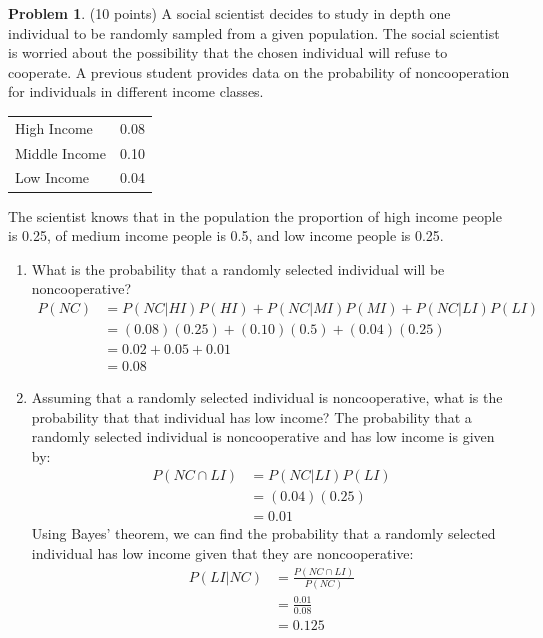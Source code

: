 \documentclass[11pt]{article}
\theoremstyle{definition}
\newtheorem{problem}{Problem}
\begin{document}
\begin{problem}
(10 points) A social scientist decides to study in depth one individual to be randomly sampled from a given population.  
The social scientist is worried about the possibility that the chosen individual will refuse to cooperate.  
A previous student provides data on the probability of noncooperation for individuals in different income classes.
\begin{center}
    \begin{tabular}{l|c}
        High Income & 0.08 \\
        Middle Income & 0.10 \\
        Low Income & 0.04
    \end{tabular}
\end{center}
The scientist knows that in the population the proportion of high income people is 0.25, of medium income people is 0.5, 
and low income people is 0.25.
\begin{enumerate}
    \item What is the probability that a randomly selected individual will be noncooperative?
    \begin{align}
        P(NC) &= P(NC|HI)P(HI) + P(NC|MI)P(MI) + P(NC|LI)P(LI) \\
        &= (0.08)(0.25) + (0.10)(0.5) + (0.04)(0.25) \\
        &= 0.02 + 0.05 + 0.01 \\
        &= 0.08
    \end{align}
    \item Assuming that a randomly selected individual is noncooperative, what is the probability that that individual has low income?
    The probability that a randomly selected individual is noncooperative and has low income is given by:
    \begin{align}
        P(NC \cap LI) &= P(NC|LI)P(LI) \\
        &= (0.04)(0.25) \\
        &= 0.01
    \end{align}
    Using Bayes' theorem, we can find the probability that a randomly selected individual has low income given that they are noncooperative:
    \begin{align}
        P(LI|NC) &= \frac{P(NC \cap LI)}{P(NC)} \\
        &= \frac{0.01}{0.08} \\
        &= 0.125
    \end{align}
\end{enumerate}
\end{problem}
\end{document}
